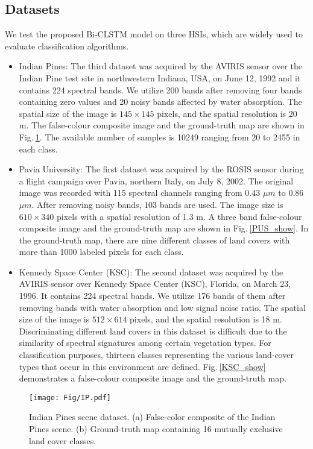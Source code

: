 \documentclass[12pt,onecolumn]{IEEEtran}
\begin{document}
\begin{spacing}{2}
\subsection{Datasets}
We test the proposed Bi-CLSTM model on three HSIs, which are widely used to evaluate classification algorithms.
\begin{itemize}
\item Indian Pines: The third dataset was acquired by the AVIRIS sensor over the Indian Pine test site in northwestern Indiana, USA, on June 12, 1992 and it contains 224 spectral bands. We utilize 200 bands after removing four bands containing zero values and 20 noisy bands affected by water absorption. The spatial size of the image is $145\times145$ pixels, and the spatial resolution is 20 m. The false-colour composite image and the ground-truth map are shown in Fig.$~$\ref{IP_show}. The available number of samples is 10249 ranging from 20 to 2455 in each class.
  \item Pavia University: The first dataset was acquired by the ROSIS sensor during a flight campaign over Pavia, northern Italy, on July 8, 2002. The original image was recorded with 115 spectral channels ranging from 0.43 $\mu{m}$ to 0.86 $\mu{m}$. After removing noisy bands, 103 bands are used. The image size is $610\times340$ pixels with a spatial resolution of 1.3 m. A three band false-colour composite image and the ground-truth map are shown in Fig.$~$\ref{PUS_show}. In the ground-truth map, there are nine different classes of land covers with more than 1000 labeled pixels for each class.
  \item Kennedy Space Center (KSC): The second dataset was acquired by the AVIRIS sensor over Kennedy Space Center (KSC), Florida, on March 23, 1996. It contains 224 spectral bands. We utilize 176 bands of them after removing bands with water absorption and low signal noise ratio. The spatial size of the image is $512\times614$ pixels, and the spatial resolution is 18 m. Discriminating different land covers in this dataset is difficult due to the similarity of spectral signatures among certain vegetation types. For classification purposes, thirteen classes representing the various land-cover types that occur in this environment are defined. Fig.$~$\ref{KSC_show} demonstrates a false-colour composite image and the ground-truth map.
\end{itemize}

\begin{figure}[htp]
  \centering
  \texttt{[image: Fig/IP.pdf]}\\
  \caption{Indian Pines scene dataset. (a) False-color composite of the Indian Pines scene. (b) Ground-truth map containing 16 mutually exclusive land cover classes.}\label{IP_show}
\end{figure}


\end{spacing}
\end{document}
